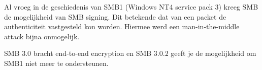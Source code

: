 Al vroeg in de geschiedenis van SMB1 (Windows NT4 service pack 3) kreeg SMB de mogelijkheid van SMB signing. Dit betekende dat van een packet de authenticiteit vastgesteld kon worden. Hiermee werd een man-in-the-middle attack bijna onmogelijk.

SMB 3.0 bracht end-to-end encryption en SMB 3.0.2 geeft je de mogelijkheid om SMB1 niet meer te ondersteunen.
